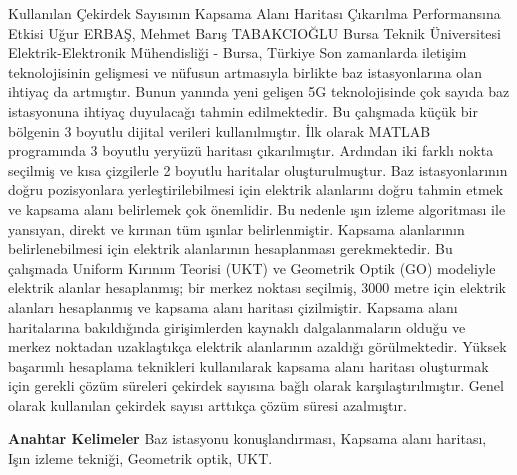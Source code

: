 
    \begin{abstract_online}{Kullanılan Çekirdek Sayısının Kapsama Alanı Haritası Çıkarılma Performansına Etkisi}{%
        Uğur ERBAŞ, Mehmet Barış TABAKCIOĞLU}{%
        }{%
        Bursa Teknik Üniversitesi Elektrik-Elektronik Mühendisliği - Bursa, Türkiye}
    Son zamanlarda iletişim teknolojisinin gelişmesi ve nüfusun artmasıyla birlikte baz istasyonlarına olan ihtiyaç da artmıştır. Bunun yanında yeni gelişen 5G teknolojisinde çok sayıda baz istasyonuna ihtiyaç duyulacağı tahmin edilmektedir. Bu çalışmada küçük bir bölgenin 3 boyutlu dijital verileri kullanılmıştır. İlk olarak MATLAB programında 3 boyutlu yeryüzü haritası çıkarılmıştır. Ardından iki farklı nokta seçilmiş ve kısa çizgilerle 2 boyutlu haritalar oluşturulmuştur. Baz istasyonlarının doğru pozisyonlara yerleştirilebilmesi için elektrik alanlarını doğru tahmin etmek ve kapsama alanı belirlemek çok önemlidir. Bu nedenle ışın izleme algoritması ile yansıyan, direkt ve kırınan tüm ışınlar belirlenmiştir. Kapsama alanlarının belirlenebilmesi için elektrik alanlarının hesaplanması gerekmektedir. Bu çalışmada Uniform Kırınım Teorisi (UKT) ve Geometrik Optik (GO) modeliyle elektrik alanlar hesaplanmış; bir merkez noktası seçilmiş, 3000 metre için elektrik alanları hesaplanmış ve kapsama alanı haritası çizilmiştir. Kapsama alanı haritalarına bakıldığında girişimlerden kaynaklı dalgalanmaların olduğu ve merkez noktadan uzaklaştıkça elektrik alanlarının azaldığı görülmektedir. Yüksek başarımlı hesaplama teknikleri kullanılarak kapsama alanı haritası oluşturmak için gerekli çözüm süreleri çekirdek sayısına bağlı olarak karşılaştırılmıştır. Genel olarak kullanılan çekirdek sayısı arttıkça çözüm süresi azalmıştır. 
    
            \textbf{Anahtar Kelimeler} \newline{}Baz istasyonu konuşlandırması, Kapsama alanı haritası, Işın izleme tekniği, Geometrik optik, UKT.
    \end{abstract_online}
    